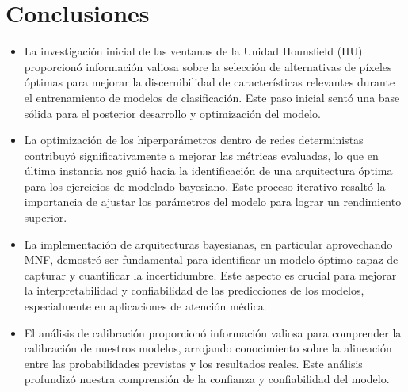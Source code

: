 \documentclass[10pt, oneside, a4paper]{article}
\begin{document}
%

	\section{Conclusiones} \label{conclusiones}
	
	\begin{itemize}
		\item La investigación inicial de las ventanas de la Unidad Hounsfield (HU) proporcionó información valiosa sobre la selección de alternativas de píxeles óptimas para mejorar la discernibilidad de características relevantes durante el entrenamiento de modelos de clasificación. Este paso inicial sentó una base sólida para el posterior desarrollo y optimización del modelo.
		
		\item La optimización de los hiperparámetros dentro de redes deterministas contribuyó significativamente a mejorar las métricas evaluadas, lo que en última instancia nos guió hacia la identificación de una arquitectura óptima para los ejercicios de modelado bayesiano. Este proceso iterativo resaltó la importancia de ajustar los parámetros del modelo para lograr un rendimiento superior.
		
		\item La implementación de arquitecturas bayesianas, en particular aprovechando MNF, demostró ser fundamental para identificar un modelo óptimo capaz de capturar y cuantificar la incertidumbre. Este aspecto es crucial para mejorar la interpretabilidad y confiabilidad de las predicciones de los modelos, especialmente en aplicaciones de atención médica.
		
		\item El análisis de calibración proporcionó información valiosa para comprender la calibración de nuestros modelos, arrojando conocimiento sobre la alineación entre las probabilidades previstas y los resultados reales. Este análisis profundizó nuestra comprensión de la confianza y confiabilidad del modelo.
		

\end{itemize}
\end{document}

